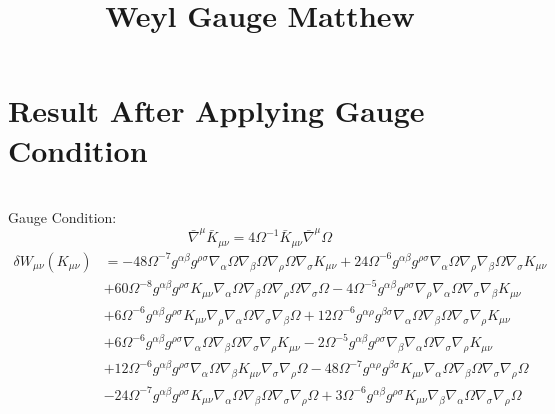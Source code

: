 \documentclass[10pt,letterpaper]{article}
\title{Weyl Gauge Matthew}
\date{}
\begin{document}
\maketitle
\noindent
\section*{Result After Applying Gauge Condition}
\ \\
Gauge Condition:
\begin{equation}
	\bar \nabla^\mu \bar K_{\mu\nu} =4\Omega^{-1}\bar K_{\mu\nu}\bar \nabla^\mu \Omega
\end{equation}
\begin{align}
	\delta  W_{\mu\nu}(K_{\mu\nu})&= 
- 48\Omega^{-7} g^{\alpha \beta} g^{\rho \sigma} \nabla_{\alpha}\Omega \nabla_{\beta}\Omega \nabla_{\rho}\Omega \nabla_{\sigma}K_{\mu \nu} + 24\Omega^{-6} g^{\alpha \beta} g^{\rho \sigma} \nabla_{\alpha}\Omega \nabla_{\rho}\nabla_{\beta}\Omega \nabla_{\sigma}K_{\mu \nu} \nonumber\\
& + 60\Omega^{-8} g^{\alpha \beta} g^{\rho \sigma} K_{\mu \nu} \nabla_{\alpha}\Omega \nabla_{\beta}\Omega \nabla_{\rho}\Omega \nabla_{\sigma}\Omega - 4\Omega^{-5} g^{\alpha \beta} g^{\rho \sigma} \nabla_{\rho}\nabla_{\alpha}\Omega \nabla_{\sigma}\nabla_{\beta}K_{\mu \nu} \nonumber \\
&+ 6\Omega^{-6} g^{\alpha \beta} g^{\rho \sigma} K_{\mu \nu} \nabla_{\rho}\nabla_{\alpha}\Omega \nabla_{\sigma}\nabla_{\beta}\Omega + 12\Omega^{-6} g^{\alpha \rho} g^{\beta \sigma} \nabla_{\alpha}\Omega \nabla_{\beta}\Omega \nabla_{\sigma}\nabla_{\rho}K_{\mu \nu}\nonumber\\
& + 6 \Omega^{-6}g^{\alpha \beta} g^{\rho \sigma} \nabla_{\alpha}\Omega \nabla_{\beta}\Omega \nabla_{\sigma}\nabla_{\rho}K_{\mu \nu} - 2\Omega^{-5} g^{\alpha \beta} g^{\rho \sigma} \nabla_{\beta}\nabla_{\alpha}\Omega \nabla_{\sigma}\nabla_{\rho}K_{\mu \nu}  \nonumber \\
&+ 12\Omega^{-6} g^{\alpha \beta} g^{\rho \sigma} \nabla_{\alpha}\Omega \nabla_{\beta}K_{\mu \nu} \nabla_{\sigma}\nabla_{\rho}\Omega -  48\Omega^{-7} g^{\alpha \rho} g^{\beta \sigma} K_{\mu \nu} \nabla_{\alpha}\Omega \nabla_{\beta}\Omega \nabla_{\sigma}\nabla_{\rho}\Omega\nonumber\\
 &-  24\Omega^{-7} g^{\alpha \beta} g^{\rho \sigma} K_{\mu \nu} \nabla_{\alpha}\Omega \nabla_{\beta}\Omega \nabla_{\sigma}\nabla_{\rho}\Omega  + 3\Omega^{-6} g^{\alpha \beta} g^{\rho \sigma} K_{\mu \nu} \nabla_{\beta}\nabla_{\alpha}\Omega \nabla_{\sigma}\nabla_{\rho}\Omega\nonumber\\

\end{align}
\end{document}
